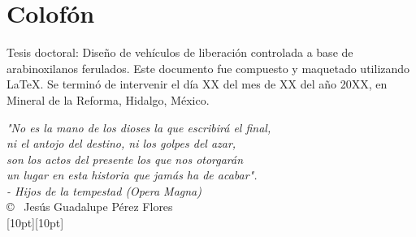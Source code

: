 \pagestyle{empty}

\hfill

\vfill


\section*{Colofón}

\quotefont Tesis doctoral: Diseño de vehículos de liberación controlada a base de arabinoxilanos ferulados. Este documento fue compuesto y maquetado utilizando {\LaTeX}. Se terminó de intervenir el día XX del mes de XX del año 20XX, en Mineral de la Reforma, Hidalgo, México.

	\begin{flushright}
	\emph{
	"No es la mano de los dioses la que escribirá el final, \\
	ni el antojo del destino, ni los golpes del azar,\\
	son los actos del presente los que nos otorgarán \\
	un lugar en esta historia que jamás ha de acabar".\\
	- Hijos de la tempestad (Opera Magna)
	} \\
\bigskip
	\copyright ~ Jesús Guadalupe Pérez Flores \\
	\Huge
	\raisebox{-4pt}[10pt][10pt]{\textxswdown}
	\end{flushright}
	
\bigskip
